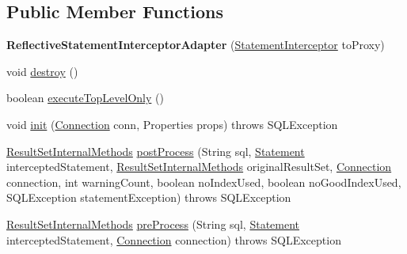 \subsection*{Public Member Functions}
\begin{DoxyCompactItemize}
\item 
\mbox{\label{classcom_1_1mysql_1_1jdbc_1_1_reflective_statement_interceptor_adapter_ae4c3d104e419e5f29c6ef980317d3de3}} 
{\bfseries Reflective\+Statement\+Interceptor\+Adapter} (\mbox{\hyperlink{interfacecom_1_1mysql_1_1jdbc_1_1_statement_interceptor}{Statement\+Interceptor}} to\+Proxy)
\item 
void \mbox{\hyperlink{classcom_1_1mysql_1_1jdbc_1_1_reflective_statement_interceptor_adapter_aa04ad6c4f60c2b7339f5dcb07ba9407a}{destroy}} ()
\item 
boolean \mbox{\hyperlink{classcom_1_1mysql_1_1jdbc_1_1_reflective_statement_interceptor_adapter_abe31396aeda856d1ef66a90f95b3d3c0}{execute\+Top\+Level\+Only}} ()
\item 
void \mbox{\hyperlink{classcom_1_1mysql_1_1jdbc_1_1_reflective_statement_interceptor_adapter_ae2a1db7cc624f326d2a0bf7d1b5b6e3d}{init}} (\mbox{\hyperlink{interfacecom_1_1mysql_1_1jdbc_1_1_connection}{Connection}} conn, Properties props)  throws S\+Q\+L\+Exception 
\item 
\mbox{\hyperlink{interfacecom_1_1mysql_1_1jdbc_1_1_result_set_internal_methods}{Result\+Set\+Internal\+Methods}} \mbox{\hyperlink{classcom_1_1mysql_1_1jdbc_1_1_reflective_statement_interceptor_adapter_a2b91745fad9110e1f8f33fc4ce4b6be1}{post\+Process}} (String sql, \mbox{\hyperlink{interfacecom_1_1mysql_1_1jdbc_1_1_statement}{Statement}} intercepted\+Statement, \mbox{\hyperlink{interfacecom_1_1mysql_1_1jdbc_1_1_result_set_internal_methods}{Result\+Set\+Internal\+Methods}} original\+Result\+Set, \mbox{\hyperlink{interfacecom_1_1mysql_1_1jdbc_1_1_connection}{Connection}} connection, int warning\+Count, boolean no\+Index\+Used, boolean no\+Good\+Index\+Used, S\+Q\+L\+Exception statement\+Exception)  throws S\+Q\+L\+Exception 
\item 
\mbox{\hyperlink{interfacecom_1_1mysql_1_1jdbc_1_1_result_set_internal_methods}{Result\+Set\+Internal\+Methods}} \mbox{\hyperlink{classcom_1_1mysql_1_1jdbc_1_1_reflective_statement_interceptor_adapter_afd1203522724452385bc67c8949586b3}{pre\+Process}} (String sql, \mbox{\hyperlink{interfacecom_1_1mysql_1_1jdbc_1_1_statement}{Statement}} intercepted\+Statement, \mbox{\hyperlink{interfacecom_1_1mysql_1_1jdbc_1_1_connection}{Connection}} connection)  throws S\+Q\+L\+Exception 
\end{DoxyCompactItemize}
